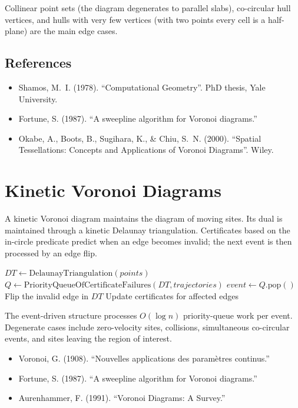 Collinear point sets (the diagram degenerates to parallel slabs), co-circular
hull vertices, and hulls with very few vertices (with two points every cell is
a half-plane) are the main edge cases.

\subsection{References}

\begin{itemize}
\item Shamos, M.~I. (1978). ``Computational Geometry''. PhD thesis, Yale
  University.
\item Fortune, S. (1987). ``A sweepline algorithm for Voronoi diagrams.'' 
\item Okabe, A., Boots, B., Sugihara, K., \& Chiu, S.~N. (2000). ``Spatial
  Tessellations: Concepts and Applications of Voronoi Diagrams''. Wiley.
\end{itemize}

\section{Kinetic Voronoi Diagrams}
\label{sec:kinetic_voronoi}

A kinetic Voronoi diagram maintains the diagram of moving sites. Its dual is
maintained through a kinetic Delaunay triangulation. Certificates based on the
in-circle predicate predict when an edge becomes invalid; the next event is
then processed by an edge flip.

\begin{algorithm}[htbp]
\caption{Kinetic Voronoi Maintenance}
\label{alg:kinetic_voronoi}
\begin{algorithmic}[1]
  \State $DT \gets \text{DelaunayTriangulation}(points)$
  \State $Q \gets \text{PriorityQueueOfCertificateFailures}(DT, trajectories)$
    \State $event \gets Q.\text{pop}()$
    \State Flip the invalid edge in $DT$
    \State Update certificates for affected edges
  \EndWhile
\EndFunction
\end{algorithmic}
\end{algorithm}

The event-driven structure processes $O(\log n)$ priority-queue work per
event. Degenerate cases include zero-velocity sites, collisions, simultaneous
co-circular events, and sites leaving the region of interest.

\begin{itemize}
\item Voronoi, G. (1908). ``Nouvelles applications des param\`etres continus.''
\item Fortune, S. (1987). ``A sweepline algorithm for Voronoi diagrams.''
\item Aurenhammer, F. (1991). ``Voronoi Diagrams: A Survey.''
\end{itemize}

